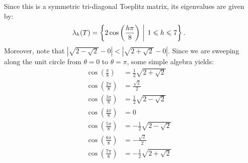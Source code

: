 \documentclass[10pt,twoside,openany]{memoir}
\begin{document}
\begin{enumerate}[label = (\alph*)]
        Since this is a symmetric tri-diagonal Toeplitz matrix, its eigenvalues are given by:
            \begin{equation*}
            \begin{split}
                \lambda_h(T) = \left\{2 \cos \left( \frac{h \pi}{8}\right) \h2\bigg|\h4 1 \leq h \leq 7\right\}.
            \end{split}
            \end{equation*}
        Moreover, note that $ \left| \sqrt{2 - \sqrt{2}} - 0\right| < \left| \sqrt{2 + \sqrt{2}} - 0\right|$. Since we are sweeping along the unit circle from $\theta = 0$ to $\theta = \pi$, some simple algebra yields:
            \begin{equation*}
            \begin{split}
                \cos\left( \frac{\pi}{8} \right) & = \frac{1}{2}\sqrt{2 + \sqrt{2}}\\
                \cos\left( \frac{2\pi}{8} \right) & = \frac{\sqrt{2}}{2}\\
                \cos\left( \frac{3\pi}{8} \right) & = \frac{1}{2}\sqrt{2 - \sqrt{2}}\\
                \cos\left( \frac{4\pi}{8} \right) & = 0\\
                \cos\left( \frac{5\pi}{8} \right) & = -\frac{1}{2}\sqrt{2 - \sqrt{2}}\\
                \cos\left( \frac{6\pi}{8} \right) & = -\frac{\sqrt{2}}{2}\\
                \cos\left( \frac{7\pi}{8} \right) & = -\frac{1}{2}\sqrt{2 + \sqrt{2}}\\
            \end{split}
            \end{equation*}


\end{enumerate}
\end{document}
